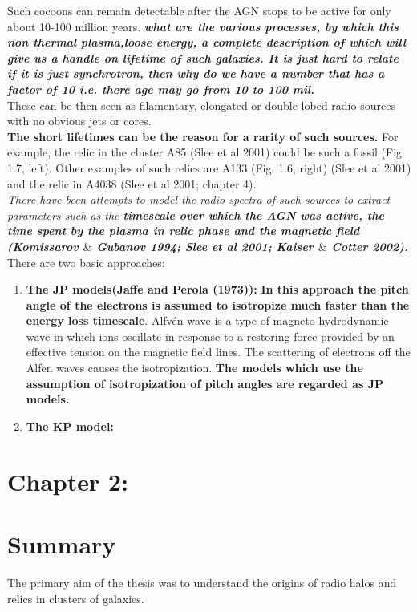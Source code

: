 \documentclass[11pt]{report}
\newcommand{\tbf}[1]{\textbf{#1}}
\newcommand{\tit}[1]{\textit{#1}}
\begin{document}
 Such cocoons can remain detectable after the AGN stops to be active for only about 10-100 million years.
\tbf{\tit{what are the various processes, by which this non thermal plasma,loose energy, a complete description of which will give us a handle on lifetime of such galaxies. It is just hard to relate if it is just synchrotron, then why do we have a number that has a factor of 10 i.e. there age may go from 10 to 100 mil.}} \\
  These can be then seen as filamentary, elongated or double
lobed radio sources with no obvious jets or cores. \\
\textbf{The short lifetimes can be the reason for a rarity of such sources. }For example, the relic in the cluster A85 (Slee
et al 2001) could be such a fossil (Fig. 1.7, left). Other examples of such relics are A133 (Fig. 1.6, right) (Slee et al 2001) and the relic in A4038 (Slee et al 2001; chapter 4).\\
\tit{There have been attempts to model the radio spectra of such sources to extract parameters such as the \tbf{timescale over which the AGN was active, the time spent by the plasma in relic phase and the magnetic field (Komissarov $\&$ Gubanov 1994; Slee et al 2001; Kaiser $\&$ Cotter 2002).} } There are two basic approaches:
\begin{enumerate}
\item \tbf{The JP models(Jaffe and Perola (1973)):}\textbf{ In this approach the pitch angle of the electrons is assumed to isotropize much faster than the energy loss timescale}. Alfvén wave is a type of magneto hydrodynamic wave in which ions oscillate in response to a restoring force provided by an effective tension on the magnetic field lines. The scattering of electrons off the Alfen waves causes the isotropization. \tbf{ The models which use the assumption of isotropization of pitch angles are regarded as JP models.}
\item \tbf{The KP model:}
\end{enumerate}

\section{Chapter 2:}
\section{Summary}
The primary aim of the thesis was to understand
the origins of radio halos and relics in clusters of galaxies. 
\end{document}
